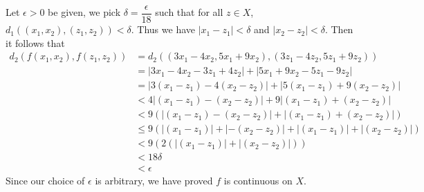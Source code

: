 \documentclass{article}
\begin{document}
\begin{enumerate}
 Let $\epsilon > 0 $ be given, we pick $\delta = \dfrac{\epsilon}{18}$ such that for all $z \in X$, $d_1((x_1,x_2),(z_1,z_2)) < \delta$. Thus we have $|x_1 -z_1|<\delta$ and $|x_2 -z_2|<\delta$. Then it follows that 
\begin{align*}
	d_2(f(x_1,x_2),f(z_1,z_2)) &= d_2((3x_1-4x_2,5x_1+9x_2),(3z_1-4z_2,5z_1+9z_2))\\
	& = |3x_1-4x_2-3z_1+4z_2|+|5x_1+9x_2-5z_1-9z_2|\\
	& = |3(x_1-z_1)-4(x_2-z_2)| + |5(x_1-z_1)+9(x_2-z_2)|\\
	& < 4|(x_1-z_1)-(x_2-z_2)| + 9|(x_1-z_1)+(x_2-z_2)|\\
	& < 9(|(x_1-z_1)-(x_2-z_2)| + |(x_1-z_1)+(x_2-z_2)|)\\
	& \leq 9(|(x_1-z_1)|+|-(x_2-z_2)| + |(x_1-z_1)|+|(x_2-z_2)|)\\
	& <9(2(|(x_1-z_1)|+|(x_2-z_2)|))\\
	& <18 \delta\\
	&<\epsilon
\end{align*}
Since our choice of $\epsilon$ is arbitrary, we have proved $f$ is continuous on $X$.\\\\



\end{enumerate}
\end{document}
